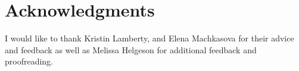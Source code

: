 \documentclass{sig-alternate}
\begin{document}
\section{Acknowledgments}
	I would like to thank Kristin Lamberty, and Elena Machkasova for their advice and feedback as well as Melissa Helgeson for additional feedback and proofreading. 



  








%
%
\end{document}
